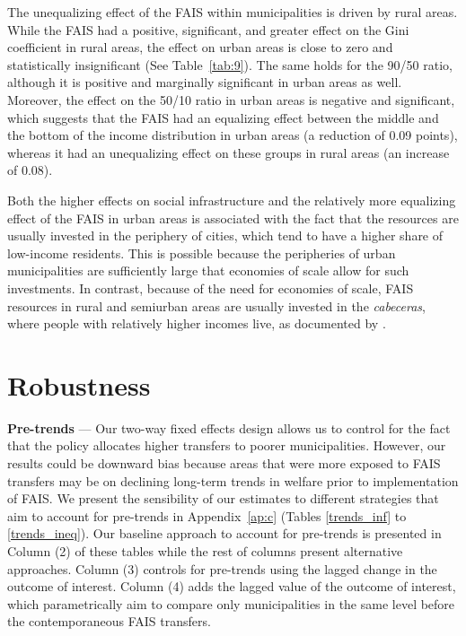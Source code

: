 \documentclass[dv_diss_main.tex]{subfiles}
\begin{document}
The unequalizing effect of the FAIS within municipalities is driven by rural areas. While the FAIS had a positive, significant, and greater effect on the Gini coefficient in rural areas, the effect on urban areas is close to zero and statistically insignificant (See Table~\ref{tab:9}). The same holds for the 90/50 ratio, although it is positive and marginally significant in urban areas as well. Moreover, the effect on the 50/10 ratio in urban areas is negative and significant, which suggests that the FAIS had an equalizing effect between the middle and the bottom of the income distribution in urban areas (a reduction of 0.09 points), whereas it had an unequalizing effect on these groups in rural areas (an increase of 0.08).

Both the higher effects on social infrastructure and the relatively more equalizing effect of the FAIS in urban areas is associated with the fact that the resources are usually invested in the periphery of cities, which tend to have a higher share of low-income residents. This is possible because the peripheries of urban municipalities are sufficiently large that economies of scale allow for such investments. In contrast, because of the need for economies of scale, FAIS resources in rural and semiurban areas are usually invested in the \textit{cabeceras}, where people with relatively higher incomes live, as documented by \cite{wellenstein2006social}.


\section{Robustness}\label{sec: Robustness}

\textbf{ Pre-trends }— Our two-way fixed effects design allows us to control for the fact that the policy allocates higher transfers to poorer municipalities. However, our results could be downward bias because areas that were more exposed to FAIS transfers may be on declining long-term trends in welfare prior to implementation of FAIS. We present the sensibility of our estimates to different strategies that aim to account for pre-trends in Appendix~\ref{ap:c} (Tables \ref{trends_inf} to \ref{trends_ineq}). Our baseline approach to account for pre-trends is presented in Column (2) of these tables while the rest of columns present alternative approaches. Column (3) controls for pre-trends using the lagged change in the outcome of interest. Column (4) adds the lagged value of the outcome of interest, which parametrically aim to compare only municipalities in the same level before the contemporaneous FAIS transfers. 
\end{document}
